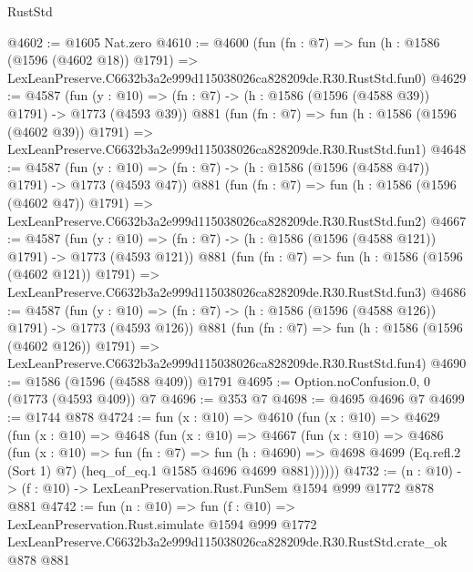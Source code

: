 \begin{lexlean}{RustStd}
\begin{coremodule}
@4602 := @1605 Nat.zero
@4610 := @4600
    (fun (fn : @7) =>
    fun (h : @1586 (@1596 (@4602 @18)) @1791) =>
    LexLeanPreserve.C6632b3a2e999d115038026ca828209de.R30.RustStd.fun0)
@4629 := @4587
    (fun (y : @10) => (fn : @7) -> (h : @1586 (@1596 (@4588 @39)) @1791) -> @1773 (@4593 @39))
    @881
    (fun (fn : @7) =>
    fun (h : @1586 (@1596 (@4602 @39)) @1791) =>
    LexLeanPreserve.C6632b3a2e999d115038026ca828209de.R30.RustStd.fun1)
@4648 := @4587
    (fun (y : @10) => (fn : @7) -> (h : @1586 (@1596 (@4588 @47)) @1791) -> @1773 (@4593 @47))
    @881
    (fun (fn : @7) =>
    fun (h : @1586 (@1596 (@4602 @47)) @1791) =>
    LexLeanPreserve.C6632b3a2e999d115038026ca828209de.R30.RustStd.fun2)
@4667 := @4587
    (fun (y : @10) => (fn : @7) -> (h : @1586 (@1596 (@4588 @121)) @1791) -> @1773 (@4593 @121))
    @881
    (fun (fn : @7) =>
    fun (h : @1586 (@1596 (@4602 @121)) @1791) =>
    LexLeanPreserve.C6632b3a2e999d115038026ca828209de.R30.RustStd.fun3)
@4686 := @4587
    (fun (y : @10) => (fn : @7) -> (h : @1586 (@1596 (@4588 @126)) @1791) -> @1773 (@4593 @126))
    @881
    (fun (fn : @7) =>
    fun (h : @1586 (@1596 (@4602 @126)) @1791) =>
    LexLeanPreserve.C6632b3a2e999d115038026ca828209de.R30.RustStd.fun4)
@4690 := @1586 (@1596 (@4588 @409)) @1791
@4695 := Option.noConfusion.{0, 0} (@1773 (@4593 @409)) @7
@4696 := @353 @7
@4698 := @4695 @4696 @7
@4699 := @1744 @878
@4724 := fun (x : @10) =>
  @4610
    (fun (x : @10) =>
    @4629
      (fun (x : @10) =>
      @4648
        (fun (x : @10) =>
        @4667
          (fun (x : @10) =>
          @4686
            (fun (x : @10) =>
            fun (fn : @7) =>
            fun (h : @4690) =>
            @4698 @4699 (Eq.refl.{2} (Sort 1) @7) (heq_of_eq.{1} @1585 @4696 @4699 @881))))))
@4732 := (n : @10) -> (f : @10) -> LexLeanPreservation.Rust.FunSem @1594 @999 @1772 @878 @881
@4742 := fun (n : @10) =>
  fun (f : @10) =>
  LexLeanPreservation.Rust.simulate
    @1594
    @999
    @1772
    LexLeanPreserve.C6632b3a2e999d115038026ca828209de.R30.RustStd.crate_ok
    @878
    @881
\end{coremodule}
\end{lexlean}
